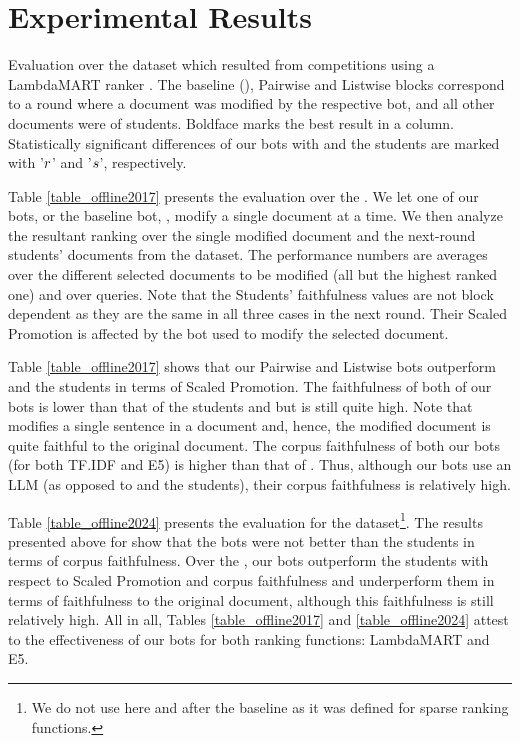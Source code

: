 \section{Experimental Results}
\label{sec:experimental-results}

\begin{table}[t]
  \caption{\label{table_offline2017} Evaluation over the \firstDataset
    dataset which resulted from competitions using a LambdaMART
    ranker \cite{raifer2017information}. The baseline (\sentReplace \cite{goren2020ranking}), Pairwise and Listwise blocks correspond to a
    round where a document was modified by the respective bot, and all other documents were of
    students. Boldface marks the best result in a column.
    Statistically significant differences of our bots with \sentReplace and the students are marked with '$r$' and '$s$', respectively.}
    \scriptsize
%

\end{table}

Table \ref{table_offline2017} presents the evaluation over the
\firstDataset. We let one of our bots, or the baseline
bot, \sentReplace \cite{goren2020ranking}, modify a single document at a time. We then
analyze the resultant ranking over the single modified document and
the next-round students' documents from the dataset. The performance numbers are averages over the different selected documents to be modified (all but the highest ranked one) and over queries. Note that the Students' faithfulness values are not block dependent as they are the same in all three cases in the next round. Their Scaled Promotion is affected by the bot used to modify the selected document.

Table \ref{table_offline2017} shows that our Pairwise and Listwise
bots outperform \sentReplace and the students in terms of Scaled
Promotion. The faithfulness of both of our bots is lower than that of
the students and \sentReplace but is still quite high. Note that \sentReplace modifies a single sentence
in a document and, hence, the modified document is quite faithful to the original
document. The corpus faithfulness of both our bots (for both TF.IDF and E5) is higher than that of \sentReplace. Thus, although our bots use an LLM (as opposed to \sentReplace and the students), their corpus faithfulness is relatively high.

Table \ref{table_offline2024} presents the evaluation for the
\secondDataset dataset\footnote{We do not use here and after the
  \sentReplace baseline as it was defined for sparse ranking
  functions.}. The results presented above for \firstDataset show that the bots were not better than the students in terms of corpus faithfulness. Over the \secondDataset, our bots outperform the students with respect to
Scaled Promotion and corpus faithfulness and underperform them in
terms of faithfulness to the original document, although this faithfulness is still relatively high. All in all, Tables
\ref{table_offline2017} and \ref{table_offline2024} attest to the
effectiveness of our bots for both ranking functions: LambdaMART and
E5.

